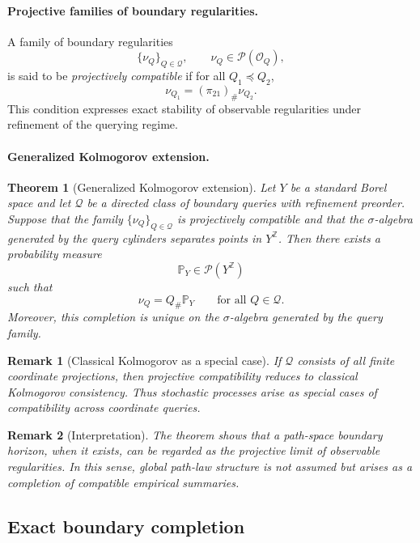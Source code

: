 \documentclass[11pt]{article}
\newtheorem{theorem}{Theorem}
\newtheorem{remark}{Remark}
\begin{document}
\paragraph{Projective families of boundary regularities.}
A family of boundary regularities
\[
\{\nu_Q\}_{Q\in\mathcal Q},
\qquad
\nu_Q\in\mathcal P(\mathcal O_Q),
\]
is said to be \emph{projectively compatible} if for all $Q_1\preceq Q_2$,
\[
\nu_{Q_1}=(\pi_{21})_\#\nu_{Q_2}.
\]
This condition expresses exact stability of observable regularities under refinement of the
querying regime.

\paragraph{Generalized Kolmogorov extension.}
\begin{theorem}[Generalized Kolmogorov extension]\label{thm:generalized-kolmogorov}
Let $Y$ be a standard Borel space and let $\mathcal Q$ be a directed class of boundary
queries with refinement preorder.  Suppose that the family $\{\nu_Q\}_{Q\in\mathcal Q}$ is
projectively compatible and that the $\sigma$-algebra generated by the query cylinders
separates points in $Y^{\mathbb Z}$.  Then there exists a probability measure
\[
\mathbb P_Y\in\mathcal P(Y^{\mathbb Z})
\]
such that
\[
\nu_Q = Q_\#\mathbb P_Y
\qquad \text{for all } Q\in\mathcal Q.
\]
Moreover, this completion is unique on the $\sigma$-algebra generated by the query family.
\end{theorem}

\begin{remark}[Classical Kolmogorov as a special case]
If $\mathcal Q$ consists of all finite coordinate projections, then projective compatibility
reduces to classical Kolmogorov consistency.  Thus stochastic processes arise as special cases
of compatibility across coordinate queries.
\end{remark}

\begin{remark}[Interpretation]
The theorem shows that a path-space boundary horizon, when it exists, can be regarded as the
projective limit of observable regularities.  In this sense, global path-law structure is not
assumed but arises as a completion of compatible empirical summaries.
\end{remark}

\subsection{Exact boundary completion}
\label{subsec:exact-boundary-completion}
\end{document}
